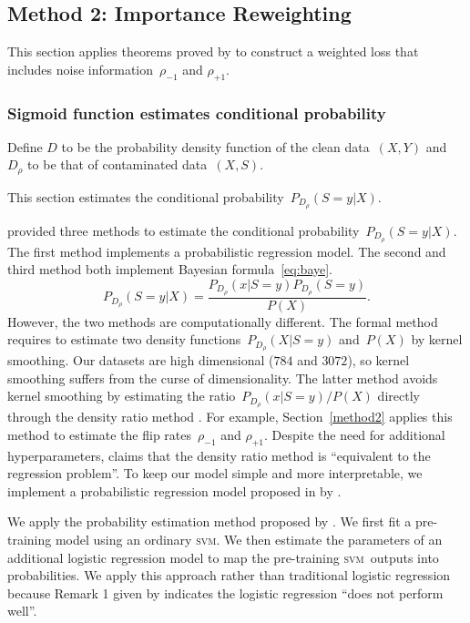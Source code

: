 \documentclass[12pt]{article} %
\newcommand{\svm}{\textsc{svm}}
\newcommand{\rhoo}{\rho_{+1}}
\newcommand{\rhoz}{\rho_{-1}}
\begin{document}


\subsection{Method 2: Importance Reweighting} \label{3rd}
This section applies theorems proved by \citet{liu2016classification} to construct a weighted loss that includes noise information~$\rhoz$ and $\rhoo$.

\subsubsection{Sigmoid function estimates conditional probability}\label{sigmoid}
Define $D$ to be the probability density function of the clean data~$(X,Y)$ and $D_\rho$ to be that of contaminated data~$(X,S)$.

This section estimates the conditional probability~$P_{D_\rho}(S=y|X)$.

\citet{liu2016classification} provided three methods to estimate the conditional probability~$P_{D_\rho}(S=y|X)$.
The first method implements a probabilistic regression model.
The second and third method both implement Bayesian formula~\eqref{eq:baye}.
\begin{equation*}
   P_{D_\rho}(S=y|X)=\frac{P_{D_\rho}(x|S=y)P_{D_\rho}(S=y)}{P(X)}.
\end{equation*}
However, the two methods are computationally different. The formal method requires to estimate two density functions~$P_{D_\rho}(X|S=y)$ and~$P(X)$ by kernel smoothing. Our datasets are high dimensional ($784$ and $3072$), so kernel smoothing suffers from the curse of dimensionality. The latter method avoids kernel smoothing by estimating the ratio~$P_{D_\rho}(x|S=y)/P(X)$ directly through the density ratio method \citep{liu2016classification}. For example, Section~\ref{method2} applies this method to estimate the flip rates~$\rhoz$ and $\rhoo$. Despite the need for additional hyperparameters,  \citet{Sugiyama10densityratio} claims that the density ratio method is ``equivalent to the regression problem''. To keep our model simple and more interpretable, we implement a probabilistic regression model proposed in by \citet[Section~5.1]{liu2016classification}.

We apply the probability estimation method proposed by \citet{Platt99probabilisticoutputs}. We first fit a pre-training model using an ordinary \svm . We then estimate the parameters of an additional logistic regression model to map the pre-training \svm\ outputs into probabilities. We apply this approach rather than traditional logistic regression because Remark 1 given by \citet{liu2016classification} indicates the logistic regression ``does not perform well''.
\end{document}

